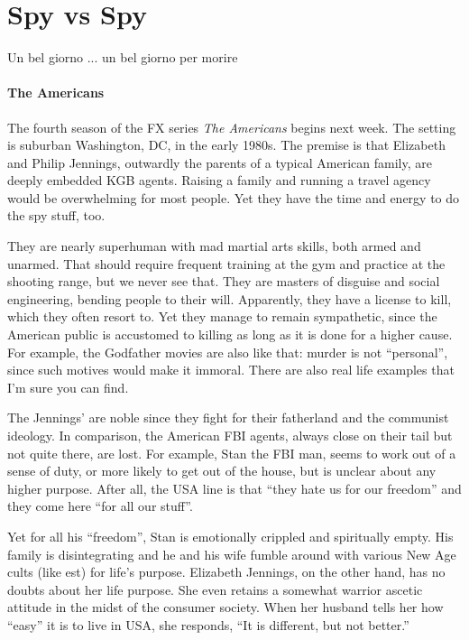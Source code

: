 \section{Spy vs Spy}

\begin{quotex}
Un bel giorno ... un bel giorno per morire
\end{quotex}


\paragraph{The Americans}

The fourth season of the FX series \emph{The Americans} begins next week. The setting is suburban Washington, DC, in the early 1980s. The premise is that Elizabeth and Philip Jennings, outwardly the parents of a typical American family, are deeply embedded KGB agents. Raising a family and running a travel agency would be overwhelming for most people. Yet they have the time and energy to do the spy stuff, too.

They are nearly superhuman with mad martial arts skills, both armed and unarmed. That should require frequent training at the gym and practice at the shooting range, but we never see that. They are masters of disguise and social engineering, bending people to their will. Apparently, they have a license to kill, which they often resort to. Yet they manage to remain sympathetic, since the American public is accustomed to killing as long as it is done for a higher cause. For example, the Godfather movies are also like that: murder is not ``personal'', since such motives would make it immoral. There are also real life examples that I'm sure you can find.

The Jennings' are noble since they fight for their fatherland and the communist ideology. In comparison, the American FBI agents, always close on their tail but not quite there, are lost. For example, Stan the FBI man, seems to work out of a sense of duty, or more likely to get out of the house, but is unclear about any higher purpose. After all, the USA line is that ``they hate us for our freedom'' and they come here ``for all our stuff''.

Yet for all his ``freedom'', Stan is emotionally crippled and spiritually empty. His family is disintegrating and he and his wife fumble around with various New Age cults (like est) for life's purpose. Elizabeth Jennings, on the other hand, has no doubts about her life purpose. She even retains a somewhat warrior ascetic attitude in the midst of the consumer society. When her husband tells her how ``easy'' it is to live in USA, she responds, ``It is different, but not better.''

